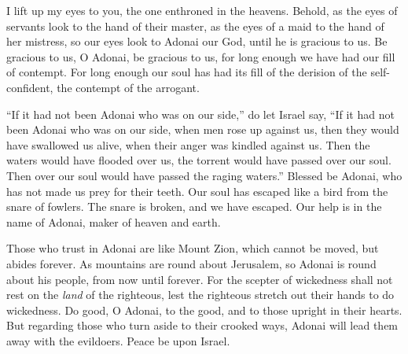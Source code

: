 \begin{biblechapter} %
 I lift up my eyes to you, 
the one enthroned in the heavens.
\verse Behold, as the eyes of servants 
look to the hand of their master, 
as the eyes of a maid to the hand of her mistress, 
so our eyes look to Adonai our God, 
until he is gracious to us.
\verse Be gracious to us, O Adonai, be gracious to us, 
for long enough we have had our fill of contempt.
\verse For long enough our soul has had its fill of 
the derision of the self-confident, 
the contempt of the arrogant.
\end{biblechapter}

\begin{biblechapter} %
 “If it had not been Adonai who was on our side,” 
do let Israel say,
\verse “If it had not been Adonai who was on our side, 
when men rose up against us,
\verse then they would have swallowed us alive, 
when their anger was kindled against us.
\verse Then the waters would have flooded over us, 
the torrent would have passed over our soul.
\verse Then over our soul would have passed 
the raging waters.”
\verse Blessed be Adonai, 
who has not made us prey for their teeth.
\verse Our soul has escaped like a bird 
from the snare of fowlers. 
The snare is broken, and we have escaped.
\verse Our help is in the name of Adonai, 
maker of heaven and earth.
\end{biblechapter}

\begin{biblechapter} %
 Those who trust in Adonai 
are like Mount Zion, which cannot be moved, 
but abides forever.
\verse As mountains are round about Jerusalem, 
so Adonai is round about his people, 
from now until forever.
\verse For the scepter of wickedness shall not rest 
on the \textit{land} of the righteous, 
lest the righteous stretch out 
their hands to do wickedness.
\verse Do good, O Adonai, to the good, 
and to those upright in their hearts.
\verse But regarding those who turn aside to their crooked ways, 
Adonai will lead them away with the evildoers. 
Peace be upon Israel.
\end{biblechapter}

